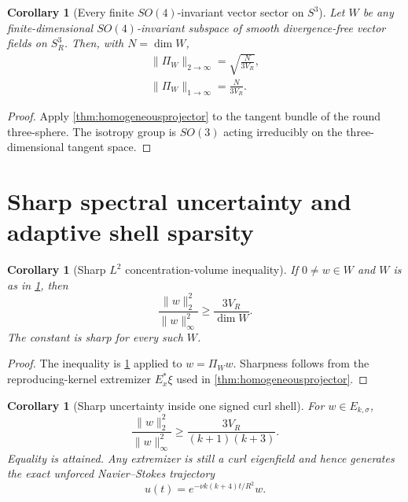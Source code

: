 \documentclass[
 aps,
 prd,
 reprint,
 amsmath,
 amssymb,
 nofootinbib,
 superscriptaddress
]{revtex4-2}
\newtheorem{corollary}[theorem]{Corollary}
\theoremstyle{definition}
\theoremstyle{remark}
\newcommand{\Sthree}{S^3_R}
\begin{document}
\begin{corollary}[Every finite $SO(4)$-invariant vector sector on $S^3$]
\label{cor:anySO4projector}
Let $W$ be any finite-dimensional $SO(4)$-invariant subspace of smooth
divergence-free vector fields on $\Sthree$.  Then, with $N=\dim W$,
\begin{align}
 \boxed{
 \|\Pi_W\|_{2\to\infty}
 =
 \sqrt{\frac{N}{3V_R}},
 }\\
 \boxed{
 \|\Pi_W\|_{1\to\infty}
 =
 \frac{N}{3V_R}.
 }
\end{align}
\end{corollary}

\begin{proof}
Apply \cref{thm:homogeneousprojector} to the tangent bundle of the round
three-sphere.  The isotropy group is $SO(3)$ acting irreducibly on the
three-dimensional tangent space.
\end{proof}



\section{Sharp spectral uncertainty and adaptive shell sparsity}

\begin{corollary}[Sharp $L^2$ concentration-volume inequality]
\label{cor:uncertainty}
If $0\ne w\in W$ and $W$ is as in
\cref{cor:anySO4projector}, then
\begin{equation}
 \boxed{
 \frac{\|w\|_2^2}{\|w\|_\infty^2}
 \ge
 \frac{3V_R}{\dim W}.
 }
 \label{eq:L2uncertainty}
\end{equation}
The constant is sharp for every such $W$.
\end{corollary}

\begin{proof}
The inequality is \cref{cor:anySO4projector} applied to $w=\Pi_Ww$.
Sharpness follows from the reproducing-kernel extremizer
$E_x^*\xi$ used in \cref{thm:homogeneousprojector}.
\end{proof}

\begin{corollary}[Sharp uncertainty inside one signed curl shell]
For $w\in E_{k,\sigma}$,
\begin{equation}
 \boxed{
 \frac{\|w\|_2^2}{\|w\|_\infty^2}
 \ge
 \frac{3V_R}{(k+1)(k+3)}.
 }
 \label{eq:shelluncertainty}
\end{equation}
Equality is attained.  Any extremizer is still a curl eigenfield and hence
generates the exact unforced Navier--Stokes trajectory
\[
 u(t)=e^{-\nu k(k+4)t/R^2}w.
\]
\end{corollary}
\end{document}
